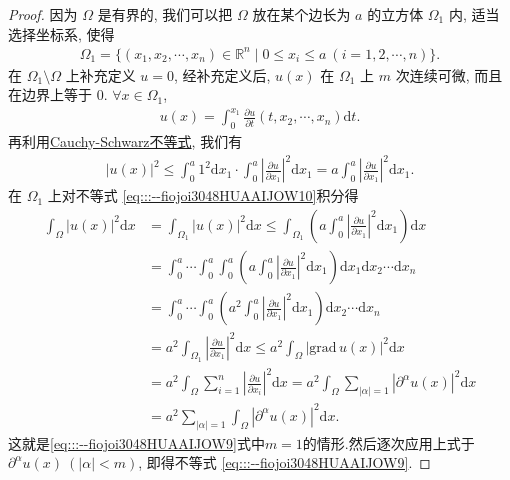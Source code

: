 \documentclass[../../main.tex]{subfiles}%
\begin{document}
\begin{proof}
因为 $\Omega$ 是有界的, 我们可以把 $\Omega$ 放在某个边长为 $a$ 的立方体 $\Omega_1$ 内, 适当选择坐标系, 使得
\begin{align*}
\Omega_1=\{(x_1,x_2,\cdots,x_n)\in\mathbb{R}^n\mid 0\leqslant x_i\leqslant a\ (i=1,2,\cdots,n)\}.
\end{align*}
在 $\Omega_1\setminus\Omega$ 上补充定义 $u=0$, 经补充定义后, $u(x)$ 在 $\Omega_1$ 上 $m$ 次连续可微, 而且在边界上等于 $0$. $\forall x\in\Omega_1$,
\begin{align*}
u(x)=\int_0^{x_1}\frac{\partial u}{\partial t}(t,x_2,\cdots,x_n)\mathrm{d}t.
\end{align*}
再利用\hyperref[theorem:泛函分析--Cauchy-Schwarz不等式]{Cauchy-Schwarz不等式}, 我们有
\begin{align}
|u(x)|^2\leqslant \int_0^a{1^2\mathrm{d}x_1}\cdot \int_0^a{\left| \frac{\partial u}{\partial x_1} \right|^2\mathrm{d}x_1}=a\int_0^a{\left| \frac{\partial u}{\partial x_1} \right|^2\mathrm{d}x_1}.\label{eq:::--fiojoi3048HUAAIJOW10}
\end{align}
在 $\Omega_1$ 上对不等式 \eqref{eq:::--fiojoi3048HUAAIJOW10}积分得
\begin{align*}
\int_{\Omega}{\left| u\left( x \right) \right|^2\mathrm{d}x}&=\int_{\Omega _1}{\left| u\left( x \right) \right|^2\mathrm{d}x}\leqslant \int_{\Omega _1}{\left( a\int_0^a{\left| \frac{\partial u}{\partial x_1} \right|^2\mathrm{d}x_1} \right) \mathrm{d}x}
\\
&=\int_0^a{\cdots \int_0^a{\int_0^a{\left( a\int_0^a{\left| \frac{\partial u}{\partial x_1} \right|^2\mathrm{d}x_1} \right) \mathrm{d}x_1\mathrm{d}x_2\cdots \mathrm{d}x_n}}}
\\
&=\int_0^a{\cdots \int_0^a{\left( a^2\int_0^a{\left| \frac{\partial u}{\partial x_1} \right|^2\mathrm{d}x_1} \right) \mathrm{d}x_2\cdots \mathrm{d}x_n}}
\\
&=a^2\int_{\Omega _1}{\left| \frac{\partial u}{\partial x_1} \right|^2\mathrm{d}x}\leqslant a^2\int_{\Omega}{\left| \mathrm{grad}\,u\left( x \right) \right|^2\mathrm{d}x}
\\
&=a^2\int_{\Omega}{\sum_{i=1}^n{\left| \frac{\partial u}{\partial x_i} \right|^2\mathrm{d}x}}=a^2\int_{\Omega}{\sum_{\left| \alpha \right|=1}{\left| \partial ^{\alpha}u\left( x \right) \right|^2}\mathrm{d}x}
\\
&=a^2\sum_{\left| \alpha \right|=1}{\int_{\Omega}{\left| \partial ^{\alpha}u\left( x \right) \right|^2\mathrm{d}x}}.
\end{align*}
这就是\eqref{eq:::--fiojoi3048HUAAIJOW9}式中$m=1$的情形.然后逐次应用上式于 $\partial^\alpha u(x)\ (|\alpha|<m)$, 即得不等式 \eqref{eq:::--fiojoi3048HUAAIJOW9}.
\end{proof}
\end{document}
